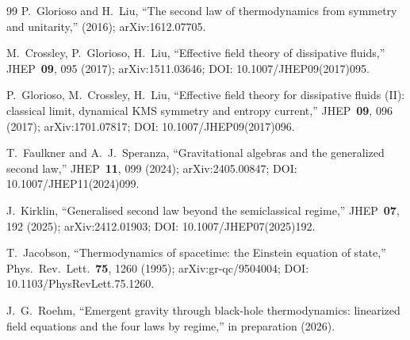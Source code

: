 \documentclass[aps,prl,reprint,nofootinbib,superscriptaddress]{revtex4-2}
\begin{document}
\begin{thebibliography}{99}
P.~Glorioso and H.~Liu, ``The second law of thermodynamics from
symmetry and unitarity,'' (2016); arXiv:1612.07705.

M.~Crossley, P.~Glorioso, H.~Liu, ``Effective field theory of
dissipative fluids,'' JHEP~\textbf{09}, 095 (2017);
arXiv:1511.03646;
DOI: 10.1007/JHEP09(2017)095.

P.~Glorioso, M.~Crossley, H.~Liu, ``Effective field theory for
dissipative fluids (II): classical limit, dynamical KMS symmetry
and entropy current,'' JHEP~\textbf{09}, 096 (2017);
arXiv:1701.07817;
DOI: 10.1007/JHEP09(2017)096.

T.~Faulkner and A.~J.~Speranza, ``Gravitational algebras and the
generalized second law,'' JHEP~\textbf{11}, 099 (2024);
arXiv:2405.00847;
DOI: 10.1007/JHEP11(2024)099.

J.~Kirklin, ``Generalised second law beyond the semiclassical
regime,'' JHEP~\textbf{07}, 192 (2025);
arXiv:2412.01903;
DOI: 10.1007/JHEP07(2025)192.

T.~Jacobson, ``Thermodynamics of spacetime: the Einstein equation
of state,'' Phys.\ Rev.\ Lett.\ \textbf{75}, 1260 (1995);
arXiv:gr-qc/9504004;
DOI: 10.1103/PhysRevLett.75.1260.

J.~G.~Roehm, ``Emergent gravity through black-hole thermodynamics:
linearized field equations and the four laws by regime,'' in preparation
(2026).

\end{thebibliography}
\end{document}
